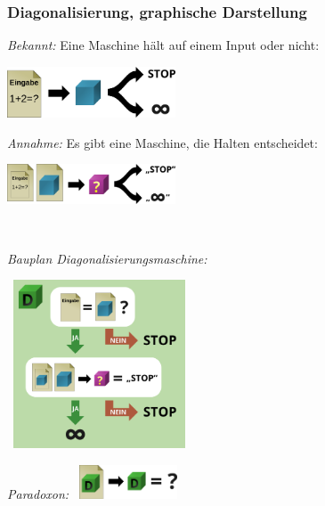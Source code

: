\documentclass[aspectratio=1610,onlymath]{beamer}
\begin{document}
\begin{frame}\frametitle{Diagonalisierung, graphische Darstellung}

\begin{minipage}{5cm}
\emph{Bekannt:} Eine Maschine hält auf einem Input oder nicht:\bigskip

\includegraphics[width=5cm]{images/halting-tm}\bigskip

\emph{Annahme:} Es gibt eine Maschine, die Halten entscheidet:\bigskip

\includegraphics[width=5cm]{images/halting-oracle}

\vspace{0.9cm}~
\end{minipage}\hfill%
\begin{minipage}{7cm}

\emph{Bauplan Diagonalisierungsmaschine:}\bigskip

~\hspace{0.5cm}\includegraphics[height=5cm]{images/halting-d}\bigskip

\emph{Paradoxon:}
~\hspace{0.5cm}\includegraphics[height=1cm,valign=c]{images/halting-paradox}%
\end{minipage}

\end{frame}
\end{document}
